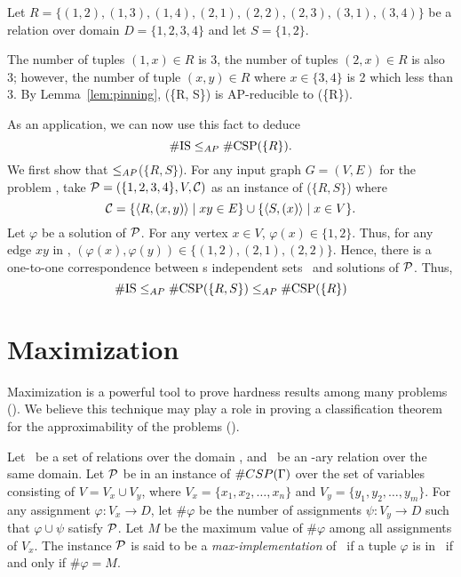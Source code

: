 \begin{example}
Let \(R=\{(1,2), (1,3), (1,4), (2,1), (2,2), (2,3), (3,1), (3,4)\}\) be a relation
over domain \(D=\{1,2,3,4\}\) and  let \(S=\{1,2\}\)\@.

The number of tuples \((1,x)\in R\) is 3, the number of tuples \((2,x) \in R\) 
is also 3; however, the number of tuple \((x,y)\in R\) where \(x\in\{3,4\}\) is 2
which less than 3\@. By Lemma~\ref{lem:pinning}, \ccsp(\{R, S\}) is AP-reducible to
\ccsp(\{R\})\@.

As an application, we can now use this fact to deduce 
\[\mathrm{\#IS} \le_{AP} \mathrm{\#CSP(}\{R\}\mathrm{)}.\]
We first show that \cisp\(\le_{AP}\)\ccsp(\(\{R,S\}\))\@.
For any input graph \(G=(V,E)\) for the problem \cisp, take
\(\mathcal{P} = (\{1,2,3,4\}, V, \mathcal{C})\) as an instance of \ccsp(\(\{R,S\}\)) where
\[\mathcal{C} = \{\langle R, (x,y) \rangle\mid xy \in E\} \cup \{\langle S, (x) \rangle \mid x \in V\}.\]
Let \(\varphi\) be a solution of \(\mathcal{P}\)\@. For any vertex \(x \in V\), \(\varphi(x)\in \{1,2\}\)\@. Thus, for any edge \(xy\) in \mG, \((\varphi(x),\varphi(y))\in 
 \{(1,2),(2,1),(2,2)\}\). Hence, there is a one-to-one correspondence between s independent sets
 \mG\ and solutions of \(\mathcal{P}\)\@. Thus,
 \[\mathrm{\#IS} \le_{AP} \mathrm{\#CSP(}\{R,S\}\mathrm{)} \le_{AP} \mathrm{\#CSP(}
 \{R\}\mathrm{)}\]
\end{example}

\section{Maximization}
Maximization is a powerful tool to prove hardness results among many problems \ccsp(\mrelset)\@.
We believe this technique may play a role in proving a classification theorem for the approximability of the problems \ccsp(\mrelset)\@.

\begin{defi}\label{def:max}
Let \mrelset\ be a set of relations over the domain \mD,
and \mR\ be an \mn-ary relation over the same domain. 
Let \(\mathcal{P}\) be in an instance of \(\#CSP(\Gamma)\) over the
set of variables consisting of \(V=V_x \cup V_y\), where \(V_x = \{x_1,x_2,\dots,x_n\}\)
and \(V_y=\{y_1,y_2,\dotsc,y_m\}\)\@. For any assignment \(\varphi: V_x\to D\),
let \(\#\varphi\) be the number of assignments \(\psi:V_y\to D\) such
that \(\varphi \cup \psi\) satisfy \(\mathcal{P}\)\@. Let \(M\) be the maximum value of \(\#\varphi\)
among all assignments of \(V_x\)\@. The instance \(\mathcal{P}\) is said to be a \emph{max-implementation}
of \mR\ if a tuple \(\varphi\) is in \mR\ if and only if \(\#\varphi = M\)\@.
\end{defi} 

